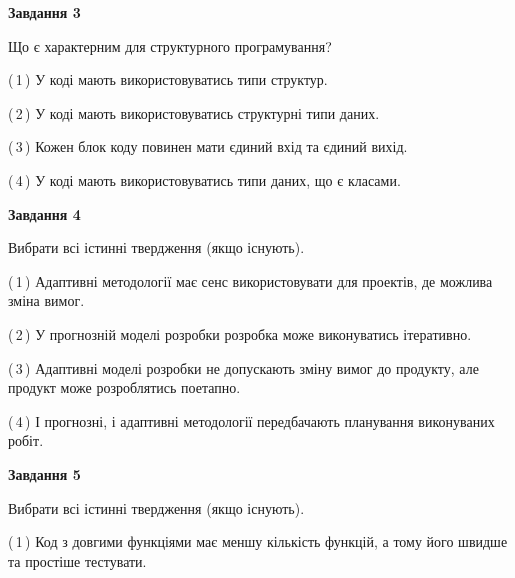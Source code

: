 \documentclass[10pt, ukrainian]{article}
\begin{document}
{\begin {large}
{\begin {center}\textbf{Завдання 3}\end {center}}\par
Що є характерним для структурного програмування?\par
\vspace{2mm}



(\,1\,) У коді мають використовуватись типи структур. %



(\,2\,) У коді мають використовуватись структурні типи даних. %



(\,3\,) Кожен блок коду повинен мати єдиний вхід та єдиний вихід.%



(\,4\,) У коді мають використовуватись типи даних, що є класами. %


{\begin {center}\textbf{Завдання 4}\end {center}}\par
Вибрати всі істинні твердження (якщо існують).\par
\vspace{2mm}



(\,1\,) Адаптивні методології має сенс використовувати для проектів, де можлива зміна вимог. %



(\,2\,) У прогнозній моделі розробки розробка може виконуватись ітеративно. %



(\,3\,) Адаптивні моделі розробки не допускають зміну вимог до продукту, але продукт може розроблятись поетапно. %



(\,4\,) І прогнозні, і адаптивні методології передбачають планування виконуваних робіт. %


{\begin {center}\textbf{Завдання 5}\end {center}}\par
Вибрати всі істинні твердження (якщо існують).\par
\vspace{2mm}



(\,1\,) Код з довгими функціями має меншу кількість функцій, а тому його швидше та простіше тестувати. %




\end{large}}
\end{document}
